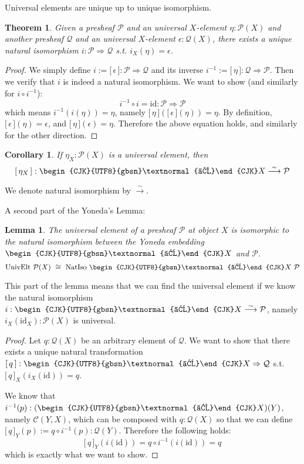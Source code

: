 \documentclass[12pt]{article}
\newtheorem{theorem}{Theorem}
\newtheorem{lemma}{Lemma}
\newtheorem{corollary}{Corollary}
\theoremstyle{definition}
\theoremstyle{remark}
\newcommand{\cat}[1]{\mathcal{#1}}
\newcommand{\psh}[1]{\mathcal{#1}}
\newcommand{\yo}{\begin{CJK}{UTF8}{gbsn}\textnormal{よ}\end{CJK}}
\newcommand{\id}{\mathrm{id}}
\newcommand{\yotrans}[1]{\lbrack\,#1\,\rbrack}
\newcommand{\natrans}{\Rightarrow}
\newcommand{\natiso}{\overset{\sim}{\longrightarrow}}
\begin{document}
Universal elements are unique up to unique isomorphism.

\begin{theorem}
  Given a presheaf $\psh{P}$ and an universal $X$-element $\eta: \psh{P}(X)$ and another presheaf $\psh{Q}$ and an universal $X$-element $\epsilon: \psh{Q}(X)$, there exists a unique natural isomorphism $i: \psh{P} \natrans \psh{Q}$ s.t. $i_X(\eta) = \epsilon$.
\end{theorem}

\begin{proof}
  We simply define $i := \yotrans{\epsilon} : \psh{P} \natrans \psh{Q}$ and its inverse $i^{-1} := \yotrans{\eta} : \psh{Q} \natrans \psh{P}$. Then we verify that $i$ is indeed a natural isomorphism. We want to show (and similarly for $i \circ i^{-1}$):
  $$
    i^{-1} \circ i = \id : \psh{P} \natrans \psh{P}
  $$
  which means $i^{-1}(i(\eta)) = \eta$, namely $\yotrans{\eta}(\yotrans{\epsilon}(\eta)) = \eta$. By definition, $\yotrans{\epsilon}(\eta) = \epsilon$, and $\yotrans{\eta}(\epsilon) = \eta$. Therefore the above equation holds, and similarly for the other direction.
\end{proof}

\begin{corollary}
  If $\eta_X: \psh{P}(X)$ is a universal element, then
  $$
    \yotrans{\eta_X} : \yo X \natiso \psh{P}
  $$
\end{corollary}
We denote natural isomorphism by $\natiso$.

A second part of the Yoneda's Lemma:
\begin{lemma}
  The universal element of a presheaf $\psh{P}$ at object $X$ is isomorphic to the natural isomorphism between the Yoneda embedding $\yo X$ and $\psh{P}$.
  $$
    \mathrm{UnivElt}~\psh{P}(X)~\cong~\mathrm{NatIso}~\yo X~\psh{P}
  $$
\end{lemma}

This part of the lemma means that we can find the universal element if we know the natural isomorphism $i: \yo X \natiso \psh{P}$, namely $i_X(\id_X) : \psh{P}(X)$ is universal.

\begin{proof}
  Let $q: \psh{Q}(X)$ be an arbitrary element of $\psh{Q}$. We want to show that there exists a unique natural transformation $\yotrans{q} : \yo X \natrans \psh{Q}$ s.t. $\yotrans{q}_X(i_X(\id)) = q$.

  We know that $i^{-1}(p) : (\yo X)(Y)$, namely $\cat{C}(Y, X)$, which can be composed with $q: \psh{Q}(X)$ so that we can define $\yotrans{q}_Y(p) := q \circ i^{-1}(p) : \psh{Q}(Y)$. Therefore the following holds:
  $$
    \yotrans{q}_Y(i(\id)) = q \circ i^{-1}(i(\id)) = q
  $$
  which is exactly what we want to show.
\end{proof}
\end{document}
